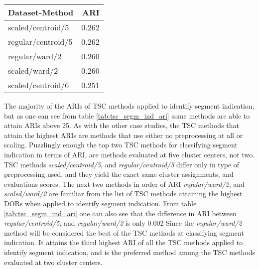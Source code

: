 \begin{table*}
    \centering
    \begin{tabular}{lr}
        \toprule
        Dataset-Method     &  ARI \\
        \midrule
        scaled/centroid/5  & 0.262 \\
        regular/centroid/5 & 0.262 \\
        regular/ward/2     & 0.260 \\
        scaled/ward/2      & 0.260 \\
        scaled/centroid/6  & 0.251 \\
        \bottomrule
    \end{tabular}
    \caption{The five highest ARI scores attained when applying TSC for detecting segmend indication.
             The \textbf{Dataset-Method} column indicates \textit{Type of preprocessing used}$/$\textit{Linkage criteria of method}$/$\textit{Number of cluster centers}.}
    \label{tab:tsc_segm_ind_ari}
\end{table*}

The majority of the ARIs of TSC methods applied to identify segment indication, but as one can see from table \ref{tab:tsc_segm_ind_ari} some methods are able to attain ARIs above 25.
As with the other case studies, the TSC methods that attain the highest ARIs are methods that use either no preprocessing at all or scaling. 
Puzzlingly enough the top two TSC methods for classifying segment indication in terms of ARI, are methods evaluated at five cluster centers, not two. 
TSC methods \textit{scaled/centroid/5}, and \textit{regular/centroid/5} differ only in type of preprocessing used, and they yield the exact same cluster assignments, and evaluations scores.
The next two methods in order of ARI \textit{regular/ward/2}, and \textit{scaled/ward/2} are familiar from the list of TSC methods attaining the highest DORs when applied to identify segment indication.
From table \ref{tab:tsc_segm_ind_ari} one can also see that the difference in ARI between \textit{regular/centroid/5}, and \textit{regular/ward/2} is only 0.002
Since the \textit{regular/ward/2} method will be considered the best of the TSC methods at classifying segment indication.
It attains the third highest ARI of all the TSC methods applied to identify segment indication, and is the preferred method among the TSC methods evaluated at two cluster centers.

